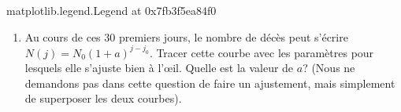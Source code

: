 \documentclass[letterpaper,10pt,english]{sphinxhowto}
\begin{document}
\begin{sphinxVerbatim}[commandchars=\\\{\}]
\PYG{p}{[}\PYG{p}{]} \PYG{p}{[}\PYG{p}{]} 

\end{sphinxVerbatim}

\begin{sphinxVerbatim}[commandchars=\\\{\}]
\PYGZlt{}matplotlib.legend.Legend at 0x7fb3f5ea84f0\PYGZgt{}
\end{sphinxVerbatim}

\noindent{}
\begin{enumerate}
%
\setcounter{enumi}{4}
\item {} 
\sphinxAtStartPar
Au cours de ces 30 premiers jours, le nombre de décès peut s’écrire \(N(j) = N_0(1+a)^{j-j_0}\). Tracer cette courbe avec les paramètres pour lesquels elle s’ajuste bien à l’œil. Quelle est la valeur de \(a\)? (Nous ne demandons pas dans cette question de faire un ajustement, mais simplement de superposer les deux courbes).

\end{enumerate}
\end{document}
